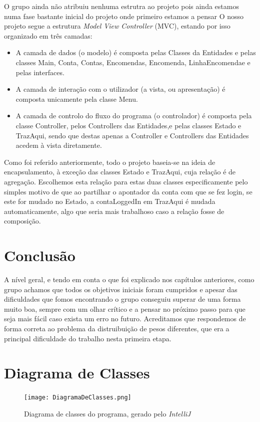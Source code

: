 \documentclass[a4paper]{report}
\begin{document}
    O grupo ainda não atribuiu nenhuma estrutra ao projeto pois ainda estamos numa fase bastante inicial do projeto onde primeiro estamos a pensar
	O nosso projeto segue a estrutura \textit{Model View Controller} (MVC), estando por isso organizado em três camadas:
	\begin{itemize}
		\item A camada de dados (o modelo) é composta pelas Classes da Entidades e pelas classes Main, Conta, Contas, Encomendas, Encomenda, LinhaEncomendae e pelas interfaces.
		\item A camada de interação com o utilizador (a vista, ou apresentação) é composta unicamente pela classe Menu.
		\item A camada de controlo do fluxo do programa (o controlador) é composta pela classe Controller, pelos Controllers das Entidades,e pelas classes Estado e TrazAqui, sendo que destas apenas a Controller e Controllers das Entidades acedem à vista diretamente.
	\end{itemize}
      Como foi referido anteriormente, todo o projeto baseia-se na ideia de encapsulamento, à exceção das classes Estado e TrazAqui, cuja relação é de agregação. Escolhemos esta relação para estas duas classes especificamente pelo simples motivo de que ao partilhar o apontador da conta com que se fez login, se este for mudado no Estado, a contaLoggedIn em TrazAqui é mudada automaticamente, algo que seria mais trabalhoso caso a relação fosse de composição.
      

	
	

	\chapter{Conclusão}

	A nível geral, e tendo em conta o que foi explicado nos capítulos anteriores, como grupo achamos que todos os objetivos iniciais foram cumpridos e apesar das dificuldades que fomos encontrando o grupo conseguiu superar de uma forma muito boa, sempre com um olhar crítico e a pensar no próximo passo para que seja mais fácil caso exista um erro no futuro. Acreditamos que respondemos de forma correta ao problema da distruibuição de pesos diferentes, que era a principal dificuldade do trabalho nesta primeira etapa.
	
	\appendix
	
	\chapter{Diagrama de Classes}
	\begin{figure}[H]
		\begin{center}
			\texttt{[image: DiagramaDeClasses.png]}
			\caption{Diagrama de classes do programa, gerado pelo \emph{IntelliJ}}
		\end{center}
	\end{figure}
\end{document}
